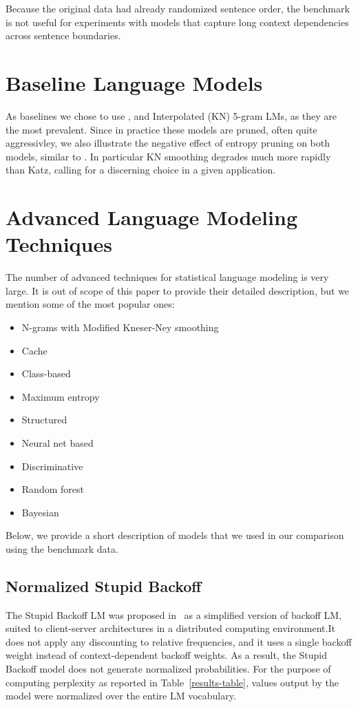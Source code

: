 \documentclass[11pt,letterpaper]{article}
\begin{document}
Because the original data had already randomized sentence order, the benchmark is not
useful for experiments with models that capture long context dependencies across
sentence boundaries.



\section{Baseline Language Models}

As baselines we chose to use \cite{Katz:1987}, and Interpolated \cite{Kneser:1995} (KN) 5-gram LMs, as they are the most prevalent. Since in practice these models are pruned, often quite aggressivley, we also illustrate the negative effect of \cite{Stolcke:1998} entropy pruning on both models, similar to \cite{Chelba:2010}. In particular KN smoothing degrades much more rapidly than Katz, calling for a discerning choice in a given application.

\section{Advanced Language Modeling Techniques}

The number of advanced techniques for statistical language modeling is very large. It is out of scope of this paper to provide their detailed description, but we mention some of the most popular ones:
\begin{itemize}\addtolength{\itemsep}{-0.5\baselineskip}
\item N-grams with Modified Kneser-Ney smoothing~\cite{Chen:1996}
\item Cache~\cite{Jelinek:1991}
\item Class-based~\cite{Brown:1992}
\item Maximum entropy~\cite{Rosenfeld:1994}
\item Structured~\cite{Chelba:2000}
\item Neural net based~\cite{Bengio:2003}
\item Discriminative~\cite{Roark:2004}
\item Random forest~\cite{Xu:2005}
\item Bayesian~\cite{Teh:2006}
\end{itemize}
Below, we provide a short description of models that we used in our comparison using the benchmark data.

\subsection{Normalized Stupid Backoff}
The Stupid Backoff LM was proposed in~\cite{Brants:2007} as a simplified version of backoff LM,
suited to client-server architectures in a distributed computing environment.It does not apply any discounting to relative frequencies, and it uses a single backoff weight instead of context-dependent backoff weights. As a result, the Stupid Backoff model does not generate normalized probabilities.
For the purpose of computing perplexity as reported in Table~\ref{results-table}, values output
by the model were normalized over the entire LM vocabulary.
\end{document}
